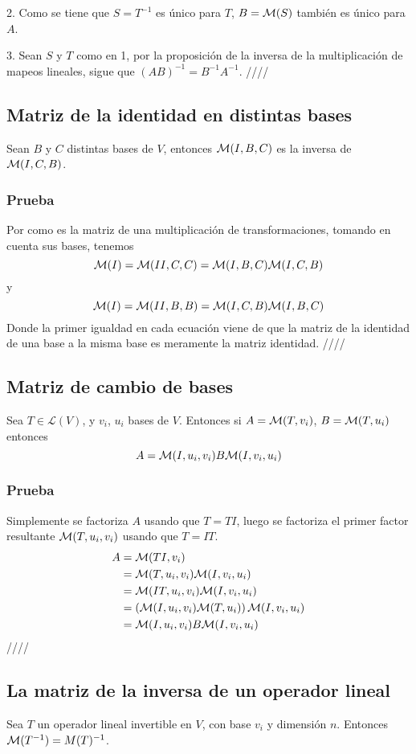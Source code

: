 \documentclass{article}
\begin{document}
2. Como se tiene que $S=T^{-1}$ es único para $T$, $B=\mathcal{M}(S)$ también
es único para $A$.

3. Sean $S$ y $T$ como en 1, por la proposición de la inversa
de la multiplicación de mapeos lineales, sigue que
$(AB)^{-1} = B^{-1}A^{-1}$.
\hfill ////

\subsection{Matriz de la identidad en distintas bases}
Sean $B$ y $C$ distintas bases de $V$, entonces
$\mathcal{M}(I,B,C)$ es la inversa de\\
$\mathcal{M}(I,C,B)$.
\subsubsection*{Prueba}
Por como es la matriz de una multiplicación de transformaciones,
tomando en cuenta sus bases, tenemos
$$\mathcal{M}(I)=\mathcal{M}(II,C,C) = \mathcal{M}(I,B,C) \mathcal{M}(I,C,B)$$
y
$$\mathcal{M}(I)=\mathcal{M}(II,B,B) = \mathcal{M}(I,C,B) \mathcal{M}(I,B,C)$$
Donde la primer igualdad en cada ecuación viene de que la matriz
de la identidad de una base a la misma base es meramente la matriz
identidad. \hfill ////
\newpage

\subsection{Matriz de cambio de bases}
Sea $T\in\mathcal{L}(V)$, y $v_i$, $u_i$ bases de $V$.
Entonces si $A=\mathcal{M}(T,v_i)$, $B=\mathcal{M}(T,u_i)$
entonces
$$A=\mathcal{M}(I,u_i, v_i)B\mathcal{M}(I,v_i,u_i)$$
\subsubsection*{Prueba}
Simplemente se factoriza $A$ usando que $T=TI$,
luego se factoriza el primer factor resultante $\mathcal{M}(T, u_i, v_i)$
usando que $T=IT$.
\begin{align*}
    A&=\mathcal{M}(TI,v_i)\\
    &=\mathcal{M}(T, u_i, v_i)\mathcal{M}(I, v_i, u_i)\\
    &=\mathcal{M}(IT, u_i, v_i)\mathcal{M}(I, v_i, u_i)\\
    &=\left(\mathcal{M}(I, u_i, v_i)\mathcal{M}(T,u_i)\right)\mathcal{M}(I, v_i, u_i)\\
    &=\mathcal{M}(I, u_i, v_i)B\mathcal{M}(I, v_i, u_i)
\end{align*}
\hfill ////

\subsection{La matriz de la inversa de un operador lineal}
Sea $T$ un operador lineal invertible en $V$, con base $v_i$ y
dimensión $n$. Entonces $\mathcal{M}(T^{-1}) = M(T)^{-1}$.
\end{document}
